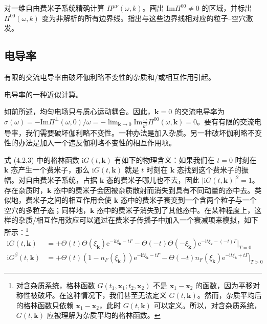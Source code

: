 对一维自由费米子系统精确计算 $\Pi^{\mu\nu}(\omega,k)$。画出 $\mathrm{Im}\Pi^{00}\neq 0$ 的区域，并标出 $\Pi^{00}(\omega,k)$ 变为非解析的所有边界线。指出与这些边界线相对应的粒子–空穴激发。

\subsection{电导率}

\begin{keypoints}
\item 有限的交流电导率由破坏伽利略不变性的杂质和/或相互作用引起。
\item 电导率的一种近似计算。
\end{keypoints}

如前所述，均匀电场只与质心运动耦合。因此，$\pmb{k}=0$ 的交流电导率为 $\sigma(\omega)=-\mathrm{Im}\Pi^{\perp}(\omega,0)/\omega=-\lim_{\pmb{k}\to 0}\mathrm{Im}\frac{\omega}{k^2}\Pi^{00}(\omega,\pmb{k})=0$。要有有限的交流电导率，我们需要破坏伽利略不变性。一种办法是加入杂质。另一种破坏伽利略不变性的办法是加入一个违反伽利略不变性的相互作用项。

式 (4.2.3) 中的格林函数 $\mathrm{i}G(t,\pmb{k})$ 有如下的物理含义：如果我们在 $t=0$ 时刻在 $\pmb{k}$ 态产生一个费米子，那么 $\mathrm{i}G(t,\pmb{k})$ 就是 $t$ 时刻在 $\pmb{k}$ 态找到这个费米子的振幅。对自由费米子系统，占据 $\pmb{k}$ 态的费米子哪儿也不去，因此 $|\mathrm{i}G(t,\pmb{k})|^2=1$。存在杂质时，$\pmb{k}$ 态中的费米子会因被杂质散射而消失到具有不同动量的态中去。类似地，费米子之间的相互作用会使 $\pmb{k}$ 态中的费米子衰变到一个含两个粒子与一个空穴的多粒子态；同样地，$\pmb{k}$ 态中的费米子消失到了其他态中。在某种程度上，这样的杂质/相互作用效应可以通过在费米子传播子中加入一个衰减项来模拟，如下所示：\footnote{对含杂质系统，格林函数 $G(t_1,\pmb{x}_1;t_2,\pmb{x}_2)$ 不是 $\pmb{x}_1-\pmb{x}_2$ 的函数，因为平移对称性被破坏。在这种情况下，我们甚至无法定义 $G(t,\pmb{k})$。然而，杂质平均后的格林函数只依赖 $\pmb{x}_1-\pmb{x}_2$，此时 $G(t,\pmb{k})$ 可以定义。所以，对含杂质系统，$G(t,\pmb{k})$ 应被理解为杂质平均的格林函数。}
\begin{align*}
\mathrm{i}G(t,\pmb{k}) &= +\Theta(t)\Theta(\xi_{\pmb{k}})\mathrm{e}^{-\mathrm{i}t\xi_{\pmb{k}}-t\Gamma} - \Theta(-t)\Theta(-\xi_{\pmb{k}})\mathrm{e}^{-\mathrm{i}t\xi_{\pmb{k}}-(-t)\Gamma}\Big|_{T=0}\\
\mathrm{i}G^{\beta}(t,\pmb{k}) &= +\Theta(t)\left(1-n_F(\xi_{\pmb{k}})\right)\mathrm{e}^{-\mathrm{i}t\xi_{\pmb{k}}-t\Gamma} - \Theta(-t)n_F(\xi_{\pmb{k}})\mathrm{e}^{-\mathrm{i}t\xi_{\pmb{k}}+t\Gamma}\Big|_{T>0} \tag{4.3.12}
\end{align*}

